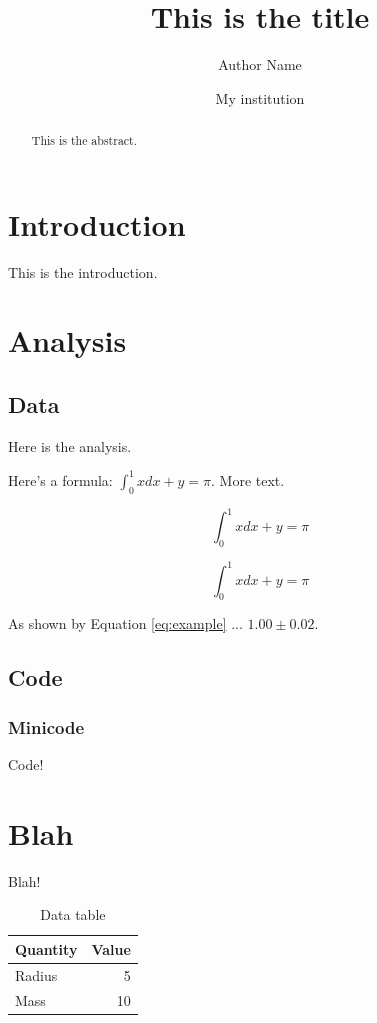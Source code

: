 \documentclass[12pt]{article}
\begin{document}
\title{This is the title}
\author{Author Name}
\date{My institution}

\maketitle

\begin{abstract}
This is the abstract.
\end{abstract}

\section{Introduction}

This is the introduction.

\section{Analysis} \label{s:analysis}

\subsection{Data}

Here is the analysis.

Here's a formula: $\int_0^1 x dx+y=\pi$. More text.

\[ \int_0^1 x dx+y=\pi \]

\begin{equation}
	\int_0^1 x dx+y=\pi
	\label{eq:example}
\end{equation}

As shown by Equation \ref{eq:example} ... $1.00\pm0.02$.

\subsection{Code}

\subsubsection{Minicode}

Code!

\section{Blah}

Blah!

\begin{table}
\caption{Data table}
\centering
\begin{tabular}{l|r} \hline
Quantity & Value \\ \hline
Radius & 5 \\
Mass & 10 \\ \hline
\end{tabular}
\end{table}
\end{document}
